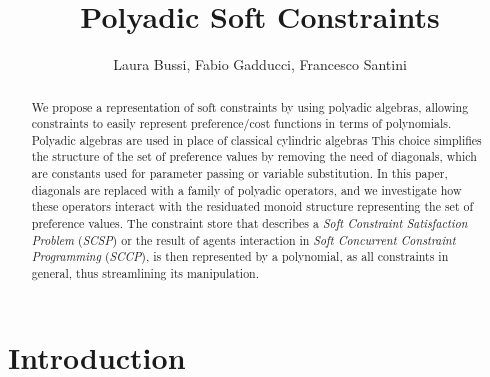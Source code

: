 \documentclass{llncs}
\newcommand\fnsep{\textsuperscript{,}}
\begin{document}
\title{Polyadic Soft Constraints}


\author{Laura Bussi, Fabio Gadducci, Francesco Santini%
} 
	

\maketitle

\begin{abstract}
We propose a representation of soft constraints by using polyadic algebras, allowing constraints to easily represent preference/cost functions in terms of polynomials. 
%
Polyadic algebras are used in place of classical cylindric algebras
%
This choice simplifies the structure of the set of preference values by removing the need of diagonals, which are constants used for parameter passing or variable substitution. 
%
In this paper, diagonals are replaced with a family of polyadic operators, and we investigate how these operators interact with the residuated monoid structure representing the set of preference values. 
%
The constraint store that describes a \emph{Soft Constraint Satisfaction Problem} (\emph{SCSP}) or the result of agents interaction in \emph{Soft Concurrent Constraint Programming} (\emph{SCCP}), 
is then represented by a polynomial, as all constraints in general, thus streamlining its manipulation.
\end{abstract}


\section{Introduction}\label{sec:intro}
\end{document}
